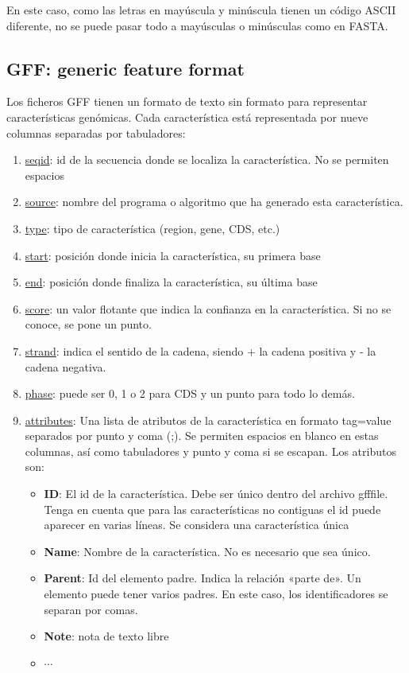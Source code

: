 En este caso, como las letras en mayúscula y minúscula tienen un código ASCII diferente, no se puede pasar todo a mayúsculas o minúsculas como en FASTA.

\subsection{GFF: generic feature format}
Los ficheros GFF tienen un formato de texto sin formato para representar características genómicas. Cada característica está representada por nueve columnas separadas por tabuladores:
\begin{enumerate}
\item \underline{seqid}: id de la secuencia donde se localiza la característica. No se permiten espacios
\item \underline{source}: nombre del programa o algoritmo que ha generado esta característica.
\item \underline{type}: tipo de característica (region, gene, CDS, etc.)
\item \underline{start}: posición donde inicia la característica, su primera base
\item \underline{end}: posición donde finaliza la característica, su última base
\item \underline{score}: un valor flotante que indica la confianza en la característica. Si no se conoce, se pone un punto.
\item \underline{strand}: indica el sentido de la cadena, siendo + la cadena positiva y - la cadena negativa.
\item \underline{phase}: puede ser 0, 1 o 2 para CDS y un punto para todo lo demás. 
\item \underline{attributes}: Una lista de atributos de la característica en formato tag=value separados por punto y coma (;). Se permiten espacios en blanco en estas columnas, así como tabuladores y punto y coma si se escapan. Los atributos son:
\begin{itemize}
\item \textbf{ID}: El id de la característica. Debe ser único dentro del archivo gfffile. Tenga en cuenta que para las características no contiguas el id puede aparecer en varias líneas. Se considera una característica única
\item \textbf{Name}: Nombre de la característica. No es necesario que sea único.
\item \textbf{Parent}: Id del elemento padre. Indica la relación «parte de». Un elemento puede tener varios padres. En este caso, los identificadores se separan por comas.
\item \textbf{Note}: nota de texto libre
\item $\cdots$
\end{itemize}
\end{enumerate}

